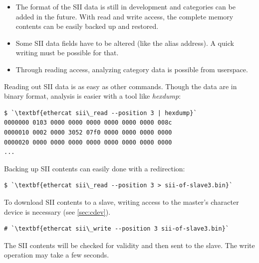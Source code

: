 \documentclass[a4paper,12pt,BCOR=6mm,bibtotoc,idxtotoc]{scrbook}
\begin{document}
\begin{itemize}

\item The format of the SII data is still in development and categories can be
added in the future. With read and write access, the complete memory contents
can be easily backed up and restored.

\item Some SII data fields have to be altered (like the alias address). A quick
writing must be possible for that.

\item Through reading access, analyzing category data is possible from
userspace.

\end{itemize}



Reading out SII data is as easy as other commands. Though the data are in
binary format, analysis is easier with a tool like \textit{hexdump}:

\begin{lstlisting}
$ `\textbf{ethercat sii\_read --position 3 | hexdump}`
0000000 0103 0000 0000 0000 0000 0000 0000 008c
0000010 0002 0000 3052 07f0 0000 0000 0000 0000
0000020 0000 0000 0000 0000 0000 0000 0000 0000
...
\end{lstlisting}

Backing up SII contents can easily done with a redirection:

\begin{lstlisting}
$ `\textbf{ethercat sii\_read --position 3 > sii-of-slave3.bin}`
\end{lstlisting}

To download SII contents to a slave, writing access to the master's character
device is necessary (see \autoref{sec:cdev}).



\begin{lstlisting}
# `\textbf{ethercat sii\_write --position 3 sii-of-slave3.bin}`
\end{lstlisting}

The SII contents will be checked for validity and then sent to the slave. The
write operation may take a few seconds.

\end{document}
